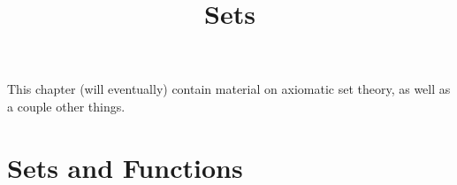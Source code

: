 

%



\title{Sets}

\maketitle

\label{section-phantom}

This chapter (will eventually) contain material on axiomatic set theory, as well as a couple other things.

\ChapterTableOfContents

\section{Sets and Functions}\label{section-sets-and-functions}
